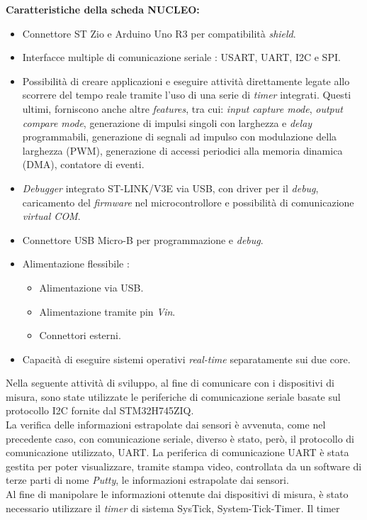 \textbf{Caratteristiche della scheda NUCLEO:}
\begin{itemize}
    \item Connettore ST Zio e Arduino Uno R3 per compatibilità \textit{shield}.
    \item Interfacce multiple di comunicazione seriale : USART, UART, I2C e SPI.
    \item Possibilità di creare applicazioni e eseguire attività direttamente legate allo scorrere del tempo reale tramite l'uso di una serie di \textit{timer} integrati. Questi ultimi, forniscono anche altre  \textit{features}, tra cui: \textit{input capture mode}, \textit{output compare mode}, generazione di impulsi singoli con larghezza e \textit{delay} programmabili, generazione di segnali ad impulso con modulazione della larghezza (PWM), generazione di accessi periodici alla memoria dinamica (DMA), contatore di eventi.
    \item \textit{Debugger} integrato ST-LINK/V3E via USB, con driver per il \textit{debug}, caricamento del \textit{firmware} nel microcontrollore e possibilità di comunicazione \textit{virtual COM}.
    \item Connettore USB Micro-B per programmazione e \textit{debug}.
    \item Alimentazione flessibile :
    \begin{itemize}
        \item Alimentazione via USB.
        \item Alimentazione tramite pin \textit{Vin}.
        \item Connettori esterni.
    \end{itemize}
    \item Capacità di eseguire sistemi operativi \textit{real-time} separatamente sui due core.
\end{itemize}
Nella seguente attività di sviluppo, al fine di comunicare con i dispositivi di misura, sono state utilizzate le periferiche di comunicazione seriale basate sul protocollo 
I2C fornite dal STM32H745ZIQ. \\
La verifica delle informazioni estrapolate dai sensori è avvenuta, come nel precedente caso, con comunicazione seriale, diverso è stato, però, il
protocollo di comunicazione utilizzato, UART. La periferica di comunicazione UART è stata gestita per poter visualizzare, tramite stampa video, controllata da un software di 
terze parti di nome \textit{Putty}, le informazioni estrapolate dai sensori.\\  
Al fine di manipolare le informazioni ottenute dai dispositivi di misura, è stato necessario utilizzare il \textit{timer} di sistema SysTick, System-Tick-Timer. Il timer
